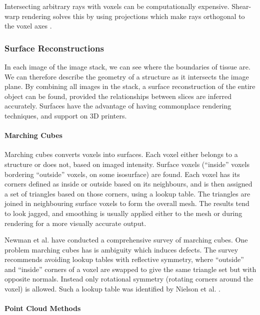\documentclass[11p, titlepage]{article}
\begin{document}
Intersecting arbitrary rays with voxels can be computationally expensive. Shear-warp rendering solves this by using projections which make rays orthogonal to the voxel axes \cite{lacroute1994fast}. 

\subsubsection{Surface Reconstructions}

In each image of the image stack, we can see where the boundaries of tissue are. We can therefore describe the geometry of a structure as it intersects the image plane. By combining all images in the stack, a surface reconstruction of the entire object can be found, provided the relationships between slices are inferred accurately. Surfaces have the advantage of having commonplace rendering techniques, and support on 3D printers.

\paragraph{Marching Cubes}

Marching cubes \cite{lorensen1987marching} converts voxels into surfaces. Each voxel either belongs to a structure or does not, based on imaged intensity. Surface voxels (``inside'' voxels bordering ``outside'' voxels, on some isosurface) are found. Each voxel has its corners defined as inside or outside based on its neighbours, and is then assigned a set of triangles based on those corners, using a lookup table. The triangles are joined in neighbouring surface voxels to form the overall mesh. The results tend to look jagged, and smoothing is usually applied either to the mesh or during rendering for a more visually accurate output.

Newman et al. \cite{newman2006survey} have conducted a comprehensive survey of marching cubes. One problem marching cubes has is ambiguity which induces defects. The survey recommends avoiding lookup tables with reflective symmetry, where ``outside'' and ``inside'' corners of a voxel are swapped to give the same triangle set but with opposite normals. Instead only rotational symmetry (rotating corners around the voxel) is allowed. Such a lookup table was identified by Nielson et al. \cite{nielson2003marching}.

\paragraph{Point Cloud Methods}
\end{document}
